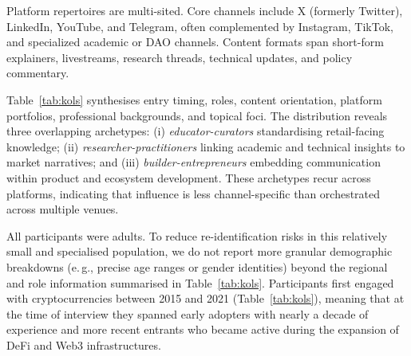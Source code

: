 Platform repertoires are multi-sited. Core channels include X (formerly Twitter), LinkedIn, YouTube, and Telegram, often complemented by Instagram, TikTok, and specialized academic or DAO channels. Content formats span short-form explainers, livestreams, research threads, technical updates, and policy commentary. %

Table~\ref{tab:kols} synthesises entry timing, roles, content orientation, platform portfolios, professional backgrounds, and topical foci. The distribution reveals three overlapping archetypes: (i) \emph{educator-curators} standardising retail-facing knowledge; (ii) \emph{researcher-practitioners} linking academic and technical insights to market narratives; and (iii) \emph{builder-entrepreneurs} embedding communication within product and ecosystem development. These archetypes recur across platforms, indicating that influence is less channel-specific than orchestrated across multiple venues.

\begin{table}[t] %
\centering
\caption{Anonymized overview of KOLs: entry timing, self-defined role, content style, platforms, background, and focus. \newline Abbrev.: YT=YouTube, TG=Telegram, X=X (formerly Twitter), IG=Instagram, TT=TikTok, LI=LinkedIn.}
\label{tab:kols}
\footnotesize
\setlength{\tabcolsep}{3pt} %
\renewcommand{\arraystretch}{1.2} %


\end{table}

All participants were adults. To reduce re-identification risks in this relatively small and specialised population, we do not report more granular demographic breakdowns (e.\,g., precise age ranges or gender identities) beyond the regional and role information summarised in Table~\ref{tab:kols}. Participants first engaged with cryptocurrencies between 2015 and 2021 (Table~\ref{tab:kols}), meaning that at the time of interview they spanned early adopters with nearly a decade of experience and more recent entrants who became active during the expansion of DeFi and Web3 infrastructures.

